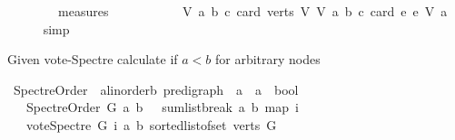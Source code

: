 \begin{isabellebody}
\ \ \ \ \ \ \ {\isasymin}\ measures\isanewline
\ \ \ \ \ \ \ \ \ \ \ {\isacharbrackleft}{\kern0pt}{\isasymlambda}{\isacharparenleft}{\kern0pt}V{\isacharcomma}{\kern0pt}\ a{\isacharcomma}{\kern0pt}\ b{\isacharcomma}{\kern0pt}\ c{\isacharparenright}{\kern0pt}{\isachardot}{\kern0pt}\ card\ {\isacharparenleft}{\kern0pt}verts\ V{\isacharparenright}{\kern0pt}{\isacharcomma}{\kern0pt}\ {\isasymlambda}{\isacharparenleft}{\kern0pt}V{\isacharcomma}{\kern0pt}\ a{\isacharcomma}{\kern0pt}\ b{\isacharcomma}{\kern0pt}\ c{\isacharparenright}{\kern0pt}{\isachardot}{\kern0pt}\ card\ {\isacharbraceleft}{\kern0pt}e{\isachardot}{\kern0pt}\ e\ {\isasymrightarrow}\isactrlsup {\isacharasterisk}{\kern0pt}\isactrlbsub V\isactrlesub \ a{\isacharbraceright}{\kern0pt}{\isacharbrackright}{\kern0pt}{\isachardoublequoteclose}\isanewline
\ \ \ \ \isamarkupfalse%
\ simp\isanewline
{}\isamarkupfalse%
%
\endisatagproof
{\isafoldproof}%
%
\isadelimproof
%
\endisadelimproof
%
\begin{isamarkuptext}%
Given vote-Spectre calculate if $a < b$ for arbitrary nodes%
\end{isamarkuptext}\isamarkuptrue%
\isamarkupfalse%
\ Spectre{\isacharunderscore}{\kern0pt}Order\ {\isacharcolon}{\kern0pt}{\isacharcolon}{\kern0pt}\ {\isachardoublequoteopen}{\isacharparenleft}{\kern0pt}{\isacharprime}{\kern0pt}a{\isacharcolon}{\kern0pt}{\isacharcolon}{\kern0pt}linorder{\isacharcomma}{\kern0pt}{\isacharprime}{\kern0pt}b{\isacharparenright}{\kern0pt}\ pre{\isacharunderscore}{\kern0pt}digraph\ {\isasymRightarrow}\ {\isacharprime}{\kern0pt}a\ {\isasymRightarrow}\ {\isacharprime}{\kern0pt}a\ {\isasymRightarrow}\ bool{\isachardoublequoteclose}\isanewline
\ \ \ {\isachardoublequoteopen}Spectre{\isacharunderscore}{\kern0pt}Order\ G\ a\ b\ {\isacharequal}{\kern0pt}\ {\isacharparenleft}{\kern0pt}\ sumlist{\isacharunderscore}{\kern0pt}break\ a\ b\ {\isacharparenleft}{\kern0pt}map\ {\isacharparenleft}{\kern0pt}{\isasymlambda}i{\isachardot}{\kern0pt}\isanewline
\ \ \ {\isacharparenleft}{\kern0pt}vote{\isacharunderscore}{\kern0pt}Spectre\ G\ i\ a\ b{\isacharparenright}{\kern0pt}{\isacharparenright}{\kern0pt}\ {\isacharparenleft}{\kern0pt}sorted{\isacharunderscore}{\kern0pt}list{\isacharunderscore}{\kern0pt}of{\isacharunderscore}{\kern0pt}set\ {\isacharparenleft}{\kern0pt}verts\ G{\isacharparenright}{\kern0pt}{\isacharparenright}{\kern0pt}{\isacharparenright}{\kern0pt}\ {\isacharequal}{\kern0pt}\ {}{\isacharparenright}{\kern0pt}{\isachardoublequoteclose}%
\begin{isamarkuptext}%

\end{isamarkuptext}
\end{isabellebody}
